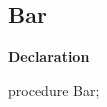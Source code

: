 \documentclass{report}
\begin{document}
\subsection*{Bar}
\begin{list}{}{
\setlength{\itemindent}{0cm}
\setlength{\listparindent}{0cm}
\setlength{\leftmargin}{\evensidemargin}
\addtolength{\leftmargin}{\tmplength}
\settowidth{\labelsep}{X}
\addtolength{\leftmargin}{\labelsep}
\setlength{\labelwidth}{\tmplength}
}
\begin{flushleft}
\item[\textbf{Declaration}\hfill]
\begin{ttfamily}
procedure Bar;\end{ttfamily}


\end{flushleft}
\end{list}
\end{document}
